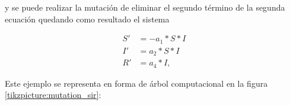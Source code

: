 y se puede realizar la mutación de eliminar el segundo término de la segunda ecuación quedando como resultado el sistema

\begin{align*}
    S' & = - a_1 * S * I \\
    I' & = a_2 * S * I   \\
    R' & = a_4 * I,
\end{align*}

Este ejemplo se representa en forma de árbol computacional en la figura \ref{tikzpicture:mutation_sir}:

\begin{center}





\end{center}
